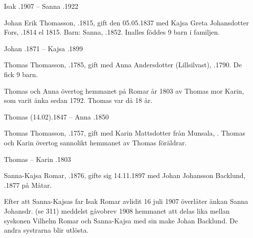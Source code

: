 Isak .1907  --  Sanna .1922



Johan Erik Thomasson, .1815, gift den 05.05.1837 med Kajsa Greta Johansdotter Fors, .1814 el 1815.
Barn: Sanna, .1852. Inalles föddes 9 barn i familjen.

Johan .1871  --  Kajsa .1899



Thomas Thomasson, .1785, gift med Anna Andersdotter (Lillsilvast), .1790. De fick 9 barn.
\begin{jhchildren}
  \item {}
  \item {}
\end{jhchildren}

Thomas och Anna övertog hemmanet på Romar år 1803 av Thomas mor Karin, som varit änka sedan 1792. Thomas var då 18 år.

Thomas (14.02).1847  --  Anna .1850



Thomas Thomasson, .1757, gift med Karin Mattsdotter från Munsala, . Thomas och Karin övertog sannolikt hemmanet av Thomas föräldrar.

\begin{jhchildren}
  \item {}
  \item {}
\end{jhchildren}

Thomas   --  Karin .1803






Sanna-Kajsa Romar, .1876, gifte sig 14.11.1897 med Johan Johansson Backlund, .1877 på Måtar.

Efter att Sanna-Kajsas far Isak Romar avlidit 16 juli 1907 överlåter änkan Sanna Johansdr. (se 311) meddelst gåvobrev 1908 hemmanet att delas lika mellan syskonen Vilhelm Romar och Sanna-Kajsa med sin make Johan Backlund. De andra systrarna blir utlösta.

